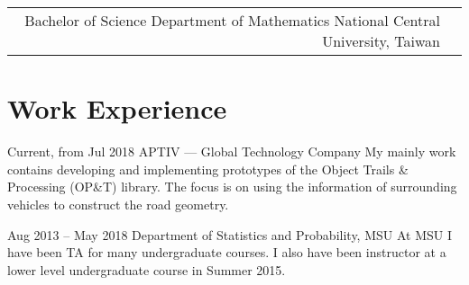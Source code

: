 \documentclass[10pt]{article} %
\begin{document}
\begin{paracol}{2}
\begin{supertabular}{rl}

    {Bachelor of Science} %
    {} %
    {Department of Mathematics} %
    {National Central University, Taiwan} %


  \end{supertabular}


  \section{Work Experience}





  {Current, from Jul 2018} %
  {APTIV --- Global Technology Company} %
  {My mainly work contains developing and implementing prototypes of the Object Trails \& Processing (OP\&T) library. The focus is on using the information of surrounding vehicles to construct the road geometry.} %


  {Aug 2013 -- May 2018} %
  {Department of Statistics and Probability, MSU} %
  {At MSU I have been TA for many undergraduate courses. I also have been instructor at a lower level undergraduate course in Summer 2015.} %


\end{paracol}
\end{document}

